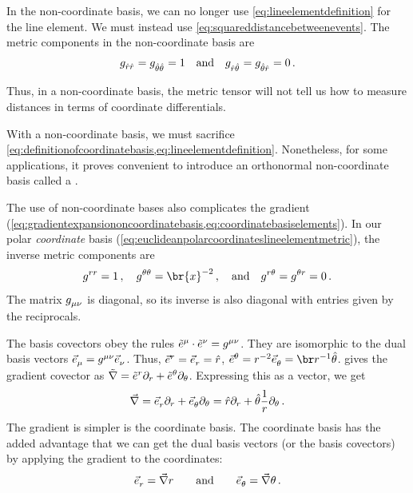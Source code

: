 In the non-coordinate basis, we can no longer use \cref{eq:lineelementdefinition} for the line element. We must instead use \cref{eq:squareddistancebetweenevents}. The metric components in the non-coordinate basis are
%
\begin{equation}\label{eq:metriccomponentsinnoncoordinatebasis}
  \tmetric{\uvec\cxpos}{\uvec\cxpos} = \tmetric{\uvec\cypos}{\uvec\cypos} = 1\quad\text{and}\quad
  \tmetric{\uvec\cxpos}{\uvec\cypos} = \tmetric{\uvec\cypos}{\uvec\cxpos} = 0\,.
\end{equation}

 Thus, in a non-coordinate basis, the metric tensor will not tell us how to measure distances in terms of coordinate differentials.

With a non-coordinate basis, we must sacrifice \cref{eq:definitionofcoordinatebasis,eq:lineelementdefinition}. Nonetheless, for some applications, it proves convenient to introduce an orthonormal non-coordinate basis called a .

 The use of non-coordinate bases also complicates the gradient (\cref{eq:gradientexpansiononcoordinatebasis,eq:coordinatebasiselements}). In our polar \emph{coordinate} basis (\cref{eq:euclideanpolarcoordinateslineelementmetric}), the inverse metric components are
%
\begin{equation}\label{eq:invmetriccomponentsincoordinatebasis}
  \tinvmet\cxpos\cxpos = 1\,,\quad
  \tinvmet\cypos\cypos = \br{\xpos}^{-2}\,,\quad\text{and}\quad
  \tinvmet\cxpos\cypos = \tinvmet\cypos\cxpos = 0\,.
\end{equation}
%
 The matrix $\tmetric\mu\nu$ is diagonal, so its inverse is also diagonal with entries given by the reciprocals.

The basis covectors obey the rules $\tbcov\mu\iprod\tbcov\nu = \tinvmet\mu\nu$. They are isomorphic to the dual basis vectors $\tbvec\mu = \tinvmet\mu\nu\tbvec\nu$. Thus, $\tensor{\bvec}{^\cxpos} = \tbvec\cxpos = \uvec\cxpos$, $\tensor{\bvec}{^\cypos} = \cxpos^{-2}\tbvec\cypos = \inv\cxpos\uvec\cypos$.  gives the gradient covector as $\gradcov = \tbcov\cxpos\ipd\cxpos + \tbcov\cypos\ipd\cypos$. Expressing this as a vector, we get
%
\begin{equation}\label{eq:gradientvectorinpolarcoordinates}
  \gradvec = \tbvec\cxpos\ipd\cxpos + \tbvec\cypos\ipd\cypos
           = \uvec\cxpos\ipd\cxpos + \uvec\cypos\dfrac 1\cxpos\ipd\cypos\,.
\end{equation}
%
 The gradient is simpler is the coordinate basis. The coordinate basis has the added advantage that we can get the dual basis vectors (or the basis covectors) by applying the gradient to the coordinates:
%
\begin{equation*}
  \tbvec\cxpos = \gradvec\cxpos\qquad\text{and}\qquad
  \tbvec\cypos = \gradvec\cypos\,.
\end{equation*}

